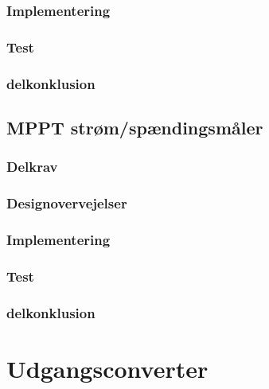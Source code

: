 \documentclass[../main.tex]{subfiles}
\begin{document}
            
        \subsubsection{Implementering}
            
            
            
            
        \subsubsection{Test}
            
            
            
            
        \subsubsection{delkonklusion}
            
            
            
            
    \subsection{MPPT strøm/spændingsmåler}
            
        \subsubsection{Delkrav}
            
        \subsubsection{Designovervejelser}
            
        \subsubsection{Implementering}
            
        \subsubsection{Test}
            
        \subsubsection{delkonklusion}
            
            
                    
\section{Udgangsconverter}
        
\end{document}
